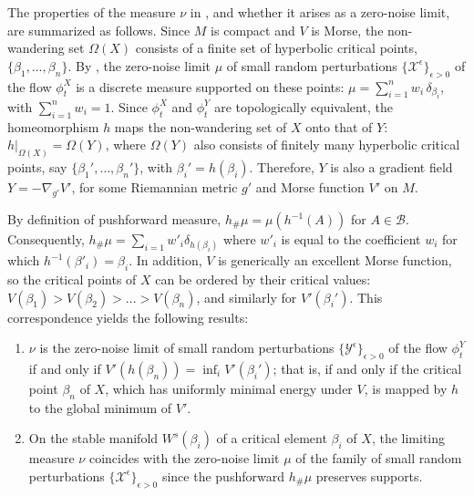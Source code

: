 \documentclass[12pt]{article}
\begin{document}
The properties of the measure $\nu$ in , and whether it arises as a zero-noise limit, are summarized as follows. Since $M$ is compact and $V$ is Morse, the non-wandering set $\Omega(X)$ consists of a finite set of hyperbolic critical points, $\{\beta_1, \dots, \beta_n\}$. By , the zero-noise limit $\mu$ of small random perturbations $\{\mathcal{X}^{\epsilon}\}_{\epsilon > 0}$ of the flow $\phi_t^X$ is a discrete measure supported on these points: $\mu = \sum_{i=1}^n w_i \, \delta_{\beta_i}$, with $\sum_{i=1}^n w_i = 1$. Since $\phi_t^X$ and $\phi_t^Y$ are topologically equivalent, the homeomorphism $h$ maps the non-wandering set of $X$ onto that of $Y$: $h|_{\Omega(X)} = \Omega(Y)$, where $\Omega(Y)$ also consists of finitely many hyperbolic critical points, say $\{\beta_1', \dots, \beta_n'\}$, with $\beta_i' = h(\beta_i)$. Therefore, $Y$ is also a gradient field $Y = -\nabla_{g'} V'$, for some Riemannian metric $g'$ and Morse function $V'$ on $M$.

By definition of pushforward measure, $h_{\#}\mu = \mu(h^{-1}(A))$ for $A \in \mathcal{B}$. Consequently, $h_{\#}\mu = \sum_{i=1}w'_i\delta_{h(\beta_i)}$ where $w'_i$ is equal to the coefficient $w_i$ for which $h^{-1}(\beta'_i) = \beta_i$. In addition, $V$ is generically an excellent Morse function, so the critical points of $X$ can be ordered by their critical values: $V(\beta_1) > V(\beta_2) > ... > V(\beta_n)$, and similarly for $V'(\beta_i')$. This correspondence yields the following results:
\begin{enumerate}[itemsep=0pt]
    \item $\nu$ is the zero-noise limit of small random perturbations $\{\mathcal{Y}^\epsilon\}_{\epsilon > 0}$ of the flow $\phi_t^Y$ if and only if $V'(h(\beta_n)) = \inf_i V'(\beta_i')$; that is, if and only if the critical point $\beta_n$ of $X$, which has uniformly minimal energy under $V$, is mapped by $h$ to the global minimum of $V'$.
    \item On the stable manifold $W^s(\beta_i)$ of a critical element $\beta_i$ of $X$, the limiting measure $\nu$ coincides with the zero-noise limit $\mu$ of the family of small random perturbations $\{ \mathcal{X}^{\epsilon}\}_{\epsilon>0}$ since the pushforward $h_{\#}\mu$ preserves supports.
\end{enumerate}






\end{document}
